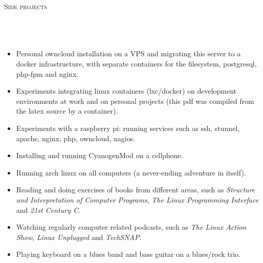 \noindent \textsc{\Huge Side projects}
\\\\\\\\
\begin{itemize}
    \vspace{-2.5mm}
    \itemsep-1mm
    \item Personal owncloud installation on a VPS and migrating this server to
        a docker infrastructure, with separate containers for the filesystem,
        postgresql, php-fpm and nginx.
    \item Experiments integrating linux containers (lxc/docker) on development
        environments at work and on personal projects (this pdf was compiled
        from the latex source by a container).
    \item Experiments with a raspberry pi: running services such as ssh,
        stunnel, apache, nginx, php, owncloud, nagios.
    \item Installing and running CyanogenMod on a cellphone.
    \item Running arch linux on all computers (a never-ending adventure in
        itself).
    \item Reading and doing exercises of books from different areas, such as
        \textit{Structure and Interpretation of Computer Programs}, \textit{The
        Linux Programming Interface} and \textit{21st Century C}.
    \item Watching regularly computer related podcasts, such as \textit{The
        Linux Action Show}, \textit{Linux Unplugged} and \textit{TechSNAP}.
    \item Playing keyboard on a blues band and bass guitar on a blues/rock
        trio.
\end{itemize}
